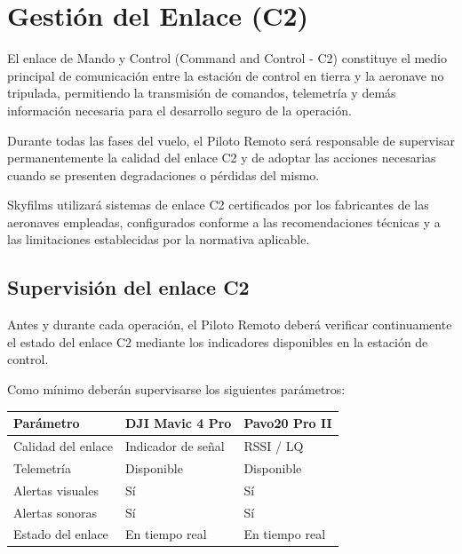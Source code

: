 \section{Gestión del Enlace (C2)}

El enlace de Mando y Control (Command and Control - C2) constituye el medio principal de comunicación entre la estación de control en tierra y la aeronave no tripulada, permitiendo la transmisión de comandos, telemetría y demás información necesaria para el desarrollo seguro de la operación.

Durante todas las fases del vuelo, el Piloto Remoto será responsable de supervisar permanentemente la calidad del enlace C2 y de adoptar las acciones necesarias cuando se presenten degradaciones o pérdidas del mismo.

Skyfilms utilizará sistemas de enlace C2 certificados por los fabricantes de las aeronaves empleadas, configurados conforme a las recomendaciones técnicas y a las limitaciones establecidas por la normativa aplicable.


\subsection{Supervisión del enlace C2}

Antes y durante cada operación, el Piloto Remoto deberá verificar continuamente el estado del enlace C2 mediante los indicadores disponibles en la estación de control.

Como mínimo deberán supervisarse los siguientes parámetros:

\renewcommand{\arraystretch}{1.3}

\begin{longtable}{|p{4.5cm}|p{4cm}|p{4cm}|}
\hline

\textbf{Parámetro} &
\textbf{DJI Mavic 4 Pro} &
\textbf{Pavo20 Pro II}

\\ \hline

Calidad del enlace &
Indicador de señal &
RSSI / LQ

\\ \hline

Telemetría &
Disponible &
Disponible

\\ \hline

Alertas visuales &
Sí &
Sí

\\ \hline

Alertas sonoras &
Sí &
Sí

\\ \hline

Estado del enlace &
En tiempo real &
En tiempo real

\\ \hline

\end{longtable}



